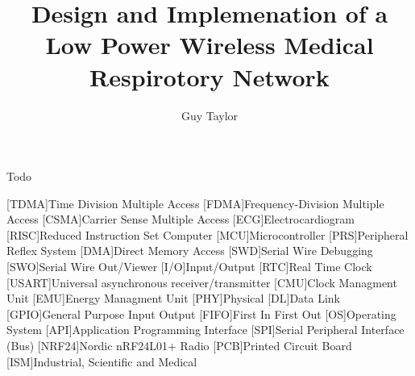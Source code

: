 \documentclass[bsc,logo,plainprepages,parskip,abbrevs,10pt]{infthesis}
\title{Design and Implemenation of a Low Power Wireless Medical Respirotory Network}
\author{Guy Taylor}
\begin{document}
\begin{preliminary}

\maketitle

\begin{acknowledgements}
  Todo
\end{acknowledgements}

\standarddeclaration

\tableofcontents

\listoffigures
\listoftables

\begin{acronym}
[TDMA]{Time Division Multiple Access}
[FDMA]{Frequency-Division Multiple Access}
[CSMA]{Carrier Sense Multiple Access}
[ECG]{Electrocardiogram}
[RISC]{Reduced Instruction Set Computer}
[MCU]{Microcontroller}
[PRS]{Peripheral Reflex System}
[DMA]{Direct Memory Access}
[SWD]{Serial Wire Debugging}
[SWO]{Serial Wire Out/Viewer}
[I/O]{Input/Output}
[RTC]{Real Time Clock}
[USART]{Universal asynchronous receiver/transmitter}
[CMU]{Clock Managment Unit}
[EMU]{Energy Managment Unit}
[PHY]{Physical}
[DL]{Data Link}
[GPIO]{General Purpose Input Output}
[FIFO]{First In First Out}
[OS]{Operating System}
[API]{Application Programming Interface}
[SPI]{Serial Peripheral Interface (Bus)}
[NRF24]{Nordic nRF24L01+ Radio}
[PCB]{Printed Circuit Board}
[ISM]{Industrial, Scientific and Medical}
\end{acronym}

\end{preliminary}









\appendix









\end{document}
